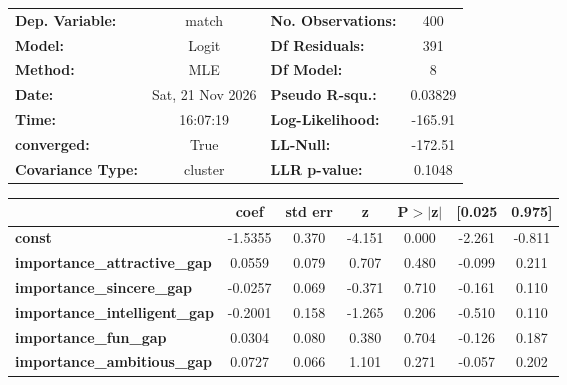 \begin{table}[htbp]
\centering
\scriptsize
\begin{center}
\begin{tabular}{lclc}
\toprule
\textbf{Dep. Variable:}                     &      match       & \textbf{  No. Observations:  } &      400    \\
\textbf{Model:}                             &      Logit       & \textbf{  Df Residuals:      } &      391    \\
\textbf{Method:}                            &       MLE        & \textbf{  Df Model:          } &        8    \\
\textbf{Date:}                              & Sat, 21 Nov 2026 & \textbf{  Pseudo R-squ.:     } &  0.03829    \\
\textbf{Time:}                              &     16:07:19     & \textbf{  Log-Likelihood:    } &   -165.91   \\
\textbf{converged:}                         &       True       & \textbf{  LL-Null:           } &   -172.51   \\
\textbf{Covariance Type:}                   &     cluster      & \textbf{  LLR p-value:       } &   0.1048    \\
\bottomrule
\end{tabular}
\begin{tabular}{lcccccc}
                                            & \textbf{coef} & \textbf{std err} & \textbf{z} & \textbf{P$> |$z$|$} & \textbf{[0.025} & \textbf{0.975]}  \\
\midrule
\textbf{const}                              &      -1.5355  &        0.370     &    -4.151  &         0.000        &       -2.261    &       -0.811     \\
\textbf{importance\_attractive\_gap}        &       0.0559  &        0.079     &     0.707  &         0.480        &       -0.099    &        0.211     \\
\textbf{importance\_sincere\_gap}           &      -0.0257  &        0.069     &    -0.371  &         0.710        &       -0.161    &        0.110     \\
\textbf{importance\_intelligent\_gap}       &      -0.2001  &        0.158     &    -1.265  &         0.206        &       -0.510    &        0.110     \\
\textbf{importance\_fun\_gap}               &       0.0304  &        0.080     &     0.380  &         0.704        &       -0.126    &        0.187     \\
\textbf{importance\_ambitious\_gap}         &       0.0727  &        0.066     &     1.101  &         0.271        &       -0.057    &        0.202     \\

\end{tabular}
\end{center}
\end{table}

